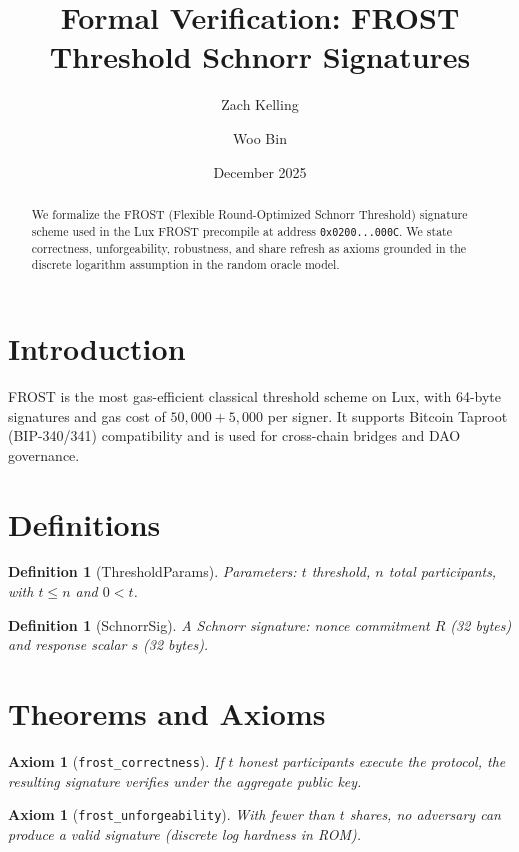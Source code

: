 \documentclass[11pt]{article}
\title{Formal Verification: FROST Threshold Schnorr Signatures}
\author{Zach Kelling \and Woo Bin}
\date{December 2025}
\newtheorem{definition}[theorem]{Definition}
\newtheorem{axiom_stmt}[theorem]{Axiom}
\begin{document}
\maketitle

\begin{abstract}
We formalize the FROST (Flexible Round-Optimized Schnorr Threshold) signature scheme used in the Lux FROST precompile at address \texttt{0x0200...000C}. We state correctness, unforgeability, robustness, and share refresh as axioms grounded in the discrete logarithm assumption in the random oracle model.
\end{abstract}

\section{Introduction}
FROST is the most gas-efficient classical threshold scheme on Lux, with 64-byte signatures and gas cost of $50{,}000 + 5{,}000$ per signer. It supports Bitcoin Taproot (BIP-340/341) compatibility and is used for cross-chain bridges and DAO governance.

\section{Definitions}
\begin{definition}[ThresholdParams]
Parameters: $t$ threshold, $n$ total participants, with $t \leq n$ and $0 < t$.
\end{definition}

\begin{definition}[SchnorrSig]
A Schnorr signature: nonce commitment $R$ (32 bytes) and response scalar $s$ (32 bytes).
\end{definition}


\section{Theorems and Axioms}
\begin{axiom_stmt}[\texttt{frost\_correctness}]
If $t$ honest participants execute the protocol, the resulting signature verifies under the aggregate public key.
\end{axiom_stmt}

\begin{axiom_stmt}[\texttt{frost\_unforgeability}]
With fewer than $t$ shares, no adversary can produce a valid signature (discrete log hardness in ROM).
\end{axiom_stmt}
\end{document}
